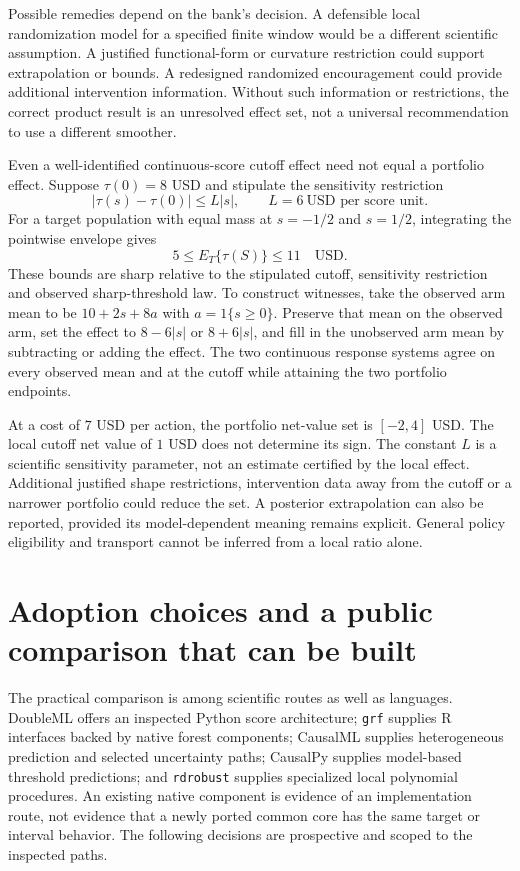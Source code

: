Possible remedies depend on the bank's decision. A defensible local
randomization model for a specified finite window would be a different
scientific assumption. A justified functional-form or curvature restriction
could support extrapolation or bounds. A redesigned randomized encouragement
could provide additional intervention information. Without such information
or restrictions, the correct product result is an unresolved effect set,
not a universal recommendation to use a different smoother.

Even a well-identified continuous-score cutoff effect need not equal a
portfolio effect. Suppose $\tau(0)=8$ USD and stipulate the sensitivity
restriction
\[
 |\tau(s)-\tau(0)|\leq L|s|,\qquad
 L=6\ \text{USD per score unit}.
\]
For a target population with equal mass at $s=-1/2$ and $s=1/2$, integrating
the pointwise envelope gives
\begin{equation}
 5\leq E_T\{\tau(S)\}\leq11\quad\text{USD}.
 \label{exec17:s4-transport-bounds}
\end{equation}
These bounds are sharp relative to the stipulated cutoff, sensitivity
restriction and observed sharp-threshold law. To construct witnesses, take
the observed arm mean to be $10+2s+8a$ with $a=1\{s\geq0\}$. Preserve
that mean on the observed arm, set the effect to $8-6|s|$ or $8+6|s|$,
and fill in the unobserved arm mean by subtracting or adding the effect.
The two continuous response systems agree on every observed mean and at the
cutoff while attaining the two portfolio endpoints.\citep{exec17_s4_math}

At a cost of $7$ USD per action, the portfolio net-value set is $[-2,4]$ USD.
The local cutoff net value of $1$ USD does not determine its sign. The constant
$L$ is a scientific sensitivity parameter, not an estimate certified by
the local effect. Additional justified shape restrictions, intervention data
away from the cutoff or a narrower portfolio could reduce the set. A
posterior extrapolation can also be reported, provided its model-dependent
meaning remains explicit. General policy eligibility and transport cannot be
inferred from a local ratio alone.

\section{Adoption choices and a public comparison that can be built}
\label{exec17:s4-adoption}

The practical comparison is among scientific routes as well as languages.
DoubleML offers an inspected Python score architecture; \texttt{grf} supplies
R interfaces backed by native forest components; CausalML supplies heterogeneous
prediction and selected uncertainty paths; CausalPy supplies model-based
threshold predictions; and \texttt{rdrobust} supplies specialized local
polynomial procedures. An existing native component is evidence of an
implementation route, not evidence that a newly ported common core has the
same target or interval behavior. The following decisions are prospective
and scoped to the inspected paths.\citep{exec17_s4_paths,exec17_s4_design}

